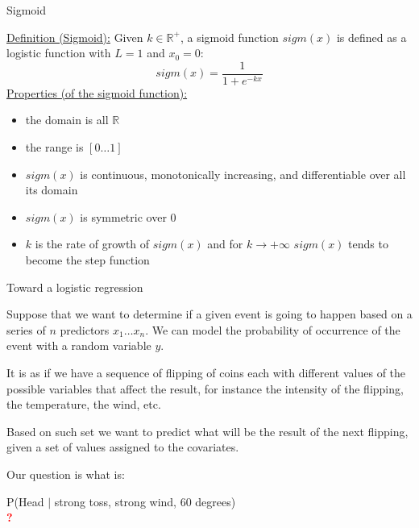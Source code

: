 \documentclass{beamer}
\begin{document}
\begin{frame}
{\centerline{Sigmoid}}
\underline{Definition (Sigmoid):} Given $k \in \mathbb{R}^+$, a
sigmoid function $sigm(x)$ is defined as a logistic function with $L = 1$ and $x_0 = 0$: 
$$ sigm(x) = \dfrac{1}{1+e^{-kx}}$$
\underline{Properties (of the sigmoid function):}
\begin{itemize}
\item the domain is all $\mathbb{R}$
\item the range is $[0 \ldots 1]$ 
\item $sigm(x)$ is continuous, monotonically increasing, and differentiable  over all its domain
\item $sigm(x)$ is symmetric over $0$
\item $k$ is the rate of growth of $sigm(x)$ and for $k \to +\infty$ $sigm(x)$ tends to become the step function
\end{itemize}

\end{frame}

\begin{frame}
{\centerline{Toward a logistic regression}}

Suppose that we want to determine if a given event is going to happen based on a series of $n$ predictors $x_1 \ldots x_n$. We can model the probability of occurrence of the event with a random variable $y$.
\newline

It is as if we have a sequence of flipping of coins each with different values of the possible variables that affect the result, for instance the intensity of the flipping, the temperature, the wind, etc.
\newline

Based on such set we want to  predict what will be the result of the next flipping, given a set of values assigned to the covariates.
\newline

Our question is what is:
\begin{center}
P(Head $|$ strong toss, strong wind, 60 degrees)\\

{\Huge \textcolor{red}{\bf ?}}
\end{center}



\end{frame}
\end{document}
